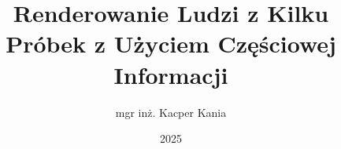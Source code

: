 \documentclass{diploma}
\title{Renderowanie Ludzi z Kilku Próbek z Użyciem Częściowej Informacji}
\author{mgr inż. Kacper Kania}
\date{2025}
\begin{document}
    \frontpages




    
    \acronymslist
\end{document}
